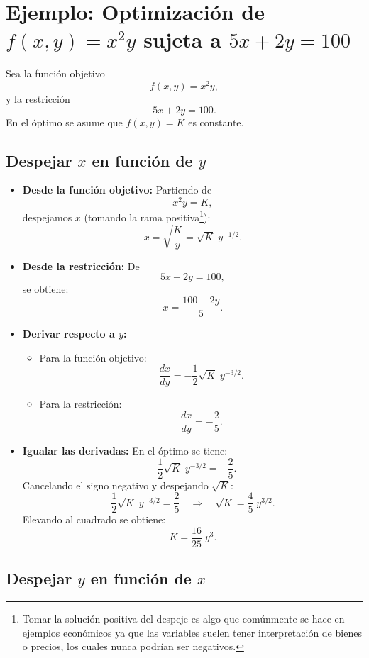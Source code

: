 \documentclass{article}
\begin{document}
\section*{Ejemplo: Optimización de \(f(x,y)=x^2y\) sujeta a \(5x+2y=100\)}

Sea la función objetivo
\[
f(x,y)=x^2y,
\]
y la restricción
\[
5x+2y=100.
\]
En el óptimo se asume que \(f(x,y)=K\) es constante.

\subsection*{Despejar \(x\) en función de \(y\)}

\begin{itemize}
    \item \textbf{Desde la función objetivo:}  
    Partiendo de
    \[
    x^2y=K,
    \]
    despejamos \(x\) (tomando la rama positiva\footnote{Tomar la solución positiva del despeje es algo que comúnmente se hace en ejemplos económicos ya que las variables suelen tener interpretación de bienes o precios, los cuales nunca podrían ser negativos.}):
    \[
    x=\sqrt{\frac{K}{y}}=\sqrt{K}\;y^{-1/2}.
    \]
    
    \item \textbf{Desde la restricción:}  
    De
    \[
    5x+2y=100,
    \]
    se obtiene:
    \[
    x=\frac{100-2y}{5}.
    \]
    
    \item \textbf{Derivar respecto a \(y\):}
    \begin{itemize}
        \item Para la función objetivo:
        \[
        \frac{dx}{dy}=-\frac{1}{2}\sqrt{K}\;y^{-3/2}.
        \]
        \item Para la restricción:
        \[
        \frac{dx}{dy}=-\frac{2}{5}.
        \]
    \end{itemize}
    
    \item \textbf{Igualar las derivadas:}  
    En el óptimo se tiene:
    \[
    -\frac{1}{2}\sqrt{K}\;y^{-3/2}=-\frac{2}{5}.
    \]
    Cancelando el signo negativo y despejando \(\sqrt{K}\):
    \[
    \frac{1}{2}\sqrt{K}\;y^{-3/2}=\frac{2}{5} \quad\Longrightarrow\quad \sqrt{K}=\frac{4}{5}\;y^{3/2}.
    \]
    Elevando al cuadrado se obtiene:
    \[
    K=\frac{16}{25}\;y^3.
    \]
\end{itemize}

\subsection*{Despejar \(y\) en función de \(x\)}
\end{document}

